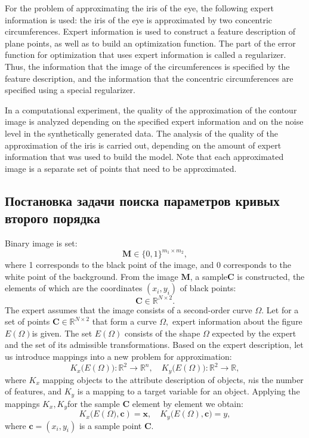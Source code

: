 For the problem of approximating the iris of the eye, the following expert information is used: the iris of the eye is approximated by two concentric circumferences. Expert information is used to construct a feature description of plane points, as well as to build an optimization function. The part of the error function for optimization that uses expert information is called a regularizer. Thus, the information that the image of the circumferences is specified by the feature description, and the information that the concentric circumferences are specified using a special regularizer.

In a computational experiment, the quality of the approximation of the contour image is analyzed depending on the specified expert information and on the noise level in the synthetically generated data. The analysis of the quality of the approximation of the iris is carried out, depending on the amount of expert information that was used to build the model. Note that each approximated image is a separate set of points that need to be approximated.

\subsection{Постановка задачи поиска параметров кривых второго порядка}
Binary image is set:
$$ \mathbf{M} \in \{0, 1 \}^{m_1\times m_2},$$
where 1 corresponds to the black point of the image, and 0 corresponds to the white point of the background.
From the image $\mathbf {M} $, a sample$ \mathbf{C}$ is constructed, the elements of which are the coordinates $(x_i, y_i)$ of black points: $$\mathbf{C} \in \mathbb{R}^{N \times 2}. $$
The expert assumes that the image consists of a second-order curve $\Omega$.
Let for a set of points $\mathbf {C} \in \mathbb {R}^{N \times 2} $ that form a curve $\Omega, $ expert information about the figure $E(\Omega) $is given.
The set $E (\Omega)$ consists of the shape $\Omega$ expected by the expert and the set of its admissible transformations. Based on the expert description, let us introduce mappings into a new problem for approximation:
\[\label{eq1}
	K_{x}\bigl(E(\Omega)\bigr): \mathbb{R}^{2} \rightarrow \mathbb{R}^{n}, \quad K_{y}\bigl(E(\Omega)\bigr): \mathbb{R}^{2} \rightarrow \mathbb{R},
\] 
where $K_{x}$ mapping objects to the attribute description of objects, $n$is the number of features, and $K_ {y}$ is a mapping to a target variable for an object. Applying the mappings $K_ {x}, K_{y}$for the sample $\mathbf {C}$ element by element we obtain:
\[
\label{eq2}
	K_{x}\bigl(E(\Omega\bigr), \mathbf{c}) = \mathbf{x}, \quad  K_{y}\bigl(E(\Omega), \mathbf{c}\bigr) = y,
\]
where $\mathbf{c} = (x_i, y_i)$ is a sample point $\mathbf{C}$.

